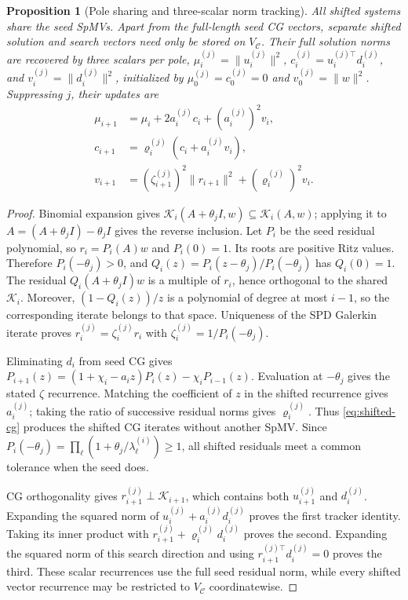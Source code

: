 \documentclass[conference]{IEEEtran}
\newtheorem{proposition}{Proposition}
\theoremstyle{definition}
\begin{document}
\begin{proposition}[Pole sharing and three-scalar norm tracking]
\label{prop:cg-tracker}
All shifted systems share the seed SpMVs. Apart from the
full-length seed CG vectors, separate shifted solution and search
vectors need only be stored on $V_{\mathcal C}$. Their full
solution norms are recovered by three scalars per pole,
$\mu_i^{(j)}=\|u_i^{(j)}\|^2$,
$c_i^{(j)}=u_i^{(j)\top}d_i^{(j)}$, and
$v_i^{(j)}=\|d_i^{(j)}\|^2$, initialized by $\mu_0^{(j)}=c_0^{(j)}=0$ and $v_0^{(j)}=\|w\|^2$. Suppressing $j$, their updates are
\begin{align}
 \mu_{i+1}&=\mu_i+2a_i^{(j)}c_i+(a_i^{(j)})^2v_i,\\
 c_{i+1}&=\varrho_i^{(j)}(c_i+a_i^{(j)}v_i),\\
 v_{i+1}&=(\zeta_{i+1}^{(j)})^2\|r_{i+1}\|^2
                         +(\varrho_i^{(j)})^2v_i.
\label{eq:three-scalar-tracker}
\end{align}
\end{proposition}
\begin{proof}
Binomial expansion gives
$\mathcal K_i(A+\theta_jI,w)\subseteq\mathcal K_i(A,w)$; applying it to $A=(A+\theta_jI)-\theta_jI$ gives the reverse inclusion. Let $P_i$ be the seed residual polynomial, so $r_i=P_i(A)w$ and $P_i(0)=1$. Its roots are positive Ritz values. Therefore $P_i(-\theta_j)>0$, and
$Q_i(z)=P_i(z-\theta_j)/P_i(-\theta_j)$ has $Q_i(0)=1$. The residual $Q_i(A+\theta_jI)w$ is a multiple of $r_i$, hence orthogonal to the shared $\mathcal K_i$. Moreover, $(1-Q_i(z))/z$ is a polynomial of degree at most $i-1$, so the corresponding iterate belongs to that space. Uniqueness of the SPD Galerkin iterate proves
$r_i^{(j)}=\zeta_i^{(j)}r_i$ with $\zeta_i^{(j)}=1/P_i(-\theta_j)$.

Eliminating $d_i$ from seed CG gives
$P_{i+1}(z)=(1+\chi_i-a_i z)P_i(z)-\chi_iP_{i-1}(z)$.
Evaluation at $-\theta_j$ gives the stated $\zeta$ recurrence. Matching the coefficient of $z$ in the shifted recurrence gives $a_i^{(j)}$; taking the ratio of successive residual norms gives ${\varrho}_i^{(j)}$. Thus \eqref{eq:shifted-cg} produces the shifted CG iterates without another SpMV. Since $P_i(-\theta_j)=\prod_\ell(1+\theta_j/\lambda_\ell^{(i)})\ge1$, all shifted residuals meet a common tolerance when the seed does.

CG orthogonality gives
$r_{i+1}^{(j)}\perp\mathcal K_{i+1}$, which contains both $u_{i+1}^{(j)}$ and $d_i^{(j)}$. Expanding the squared norm of $u_i^{(j)}+a_i^{(j)}d_i^{(j)}$ proves the first tracker identity. Taking its inner product with $r_{i+1}^{(j)}+{\varrho}_i^{(j)}d_i^{(j)}$ proves the second. Expanding the squared norm of this search direction and using $r_{i+1}^{(j)\top}d_i^{(j)}=0$ proves the third. These scalar recurrences use the full seed residual norm, while every shifted vector recurrence may be restricted to $V_{\mathcal C}$ coordinatewise.
\end{proof}
\end{document}
